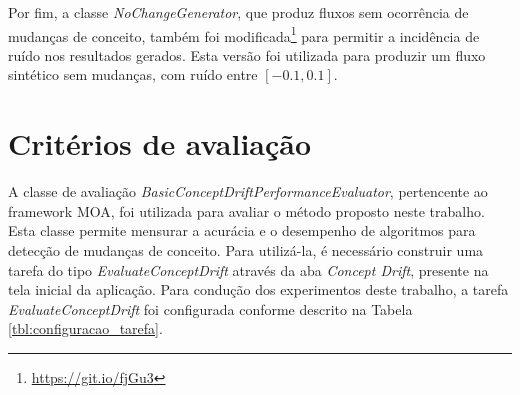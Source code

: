 \documentclass[msc, classic, a4paper]{ufbathesis}
\begin{document}


Por fim, a classe \textit{NoChangeGenerator}, que produz fluxos sem ocorrência de mudanças de conceito, também foi modificada\footnote{\url{https://git.io/fjGu3}} para permitir a incidência de ruído nos resultados gerados.
Esta versão foi utilizada para produzir um fluxo sintético sem mudanças, com ruído entre $[-0.1, 0.1]$.

\section{Critérios de avaliação}

A classe de avaliação \textit{BasicConceptDriftPerformanceEvaluator}, pertencente ao framework MOA, foi utilizada para avaliar o método proposto neste trabalho.
Esta classe permite mensurar a acurácia e o desempenho de algoritmos para detecção de mudanças de conceito.
Para utilizá-la, é necessário construir uma tarefa do tipo \textit{EvaluateConceptDrift} através da aba \textit{Concept Drift}, presente na tela inicial da aplicação.
Para condução dos experimentos deste trabalho, a tarefa \textit{EvaluateConceptDrift} foi configurada conforme descrito na Tabela \ref{tbl:configuracao_tarefa}.
\end{document}
